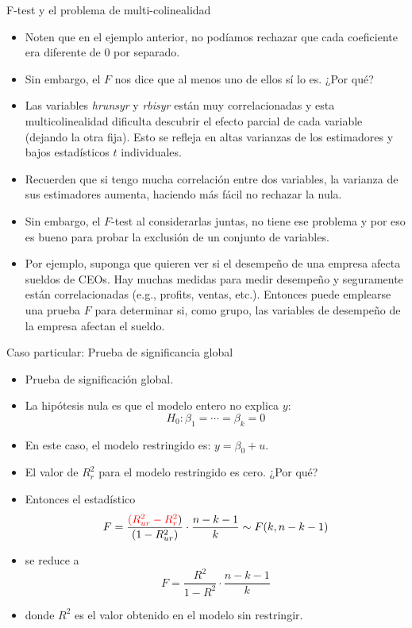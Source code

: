 \documentclass{beamer}
\begin{document}
\begin{frame}[shrink=10]{F-test y el problema de multi-colinealidad}
    \begin{itemize}
        \item Noten que en el ejemplo anterior, no podíamos rechazar que cada coeficiente
        era diferente de 0 por separado.
        \item Sin embargo, el $F$ nos dice que al menos uno de ellos sí lo es. ¿Por qué?
        \item Las variables \textit{hrunsyr} y \textit{rbisyr} están muy correlacionadas y esta
        multicolinealidad dificulta descubrir el efecto parcial de cada variable (dejando
        la otra fija). Esto se refleja en altas varianzas de los estimadores y bajos
        estadísticos $t$ individuales.
        \item Recuerden que si tengo mucha correlación entre dos variables, la varianza de
        sus estimadores aumenta, haciendo más fácil no rechazar la nula.
        \item Sin embargo, el $F$-test al considerarlas juntas, no tiene ese problema y por eso
        es bueno para probar la exclusión de un conjunto de variables.
        \item Por ejemplo, suponga que quieren ver si el desempeño de una empresa afecta
        sueldos de CEOs. Hay muchas medidas para medir desempeño y seguramente
        están correlacionadas (e.g., profits, ventas, etc.). Entonces puede emplearse
        una prueba $F$ para determinar si, como grupo, las variables de desempeño de
        la empresa afectan el sueldo.
    \end{itemize}
\end{frame}

\begin{frame}{Caso particular: Prueba de significancia global}
    \begin{itemize}
        \item Prueba de significación global.
        \item La hipótesis nula es que el modelo entero no explica $y$:
        \[
        H_0 : \beta_1 = \cdots = \beta_k = 0
        \]
        \item En este caso, el modelo restringido es: $y = \beta_0 + u$.
        \item El valor de $R^2_r$ para el modelo restringido es cero. ¿Por qué?
        \item Entonces el estadístico
        \[
        F = \frac{\textcolor{red}{(R^2_{ur} - R^2_{r}})}{(1 - R^2_{ur})} \cdot \frac{n - k - 1}{k} \sim F(k, n - k - 1)
        \]
        \item se reduce a
        \[
        F = \frac{R^2}{1 - R^2} \cdot \frac{n - k - 1}{k}
        \]
        \item donde $R^2$ es el valor obtenido en el modelo sin restringir.
        
    \end{itemize}
\end{frame}
\end{document}
